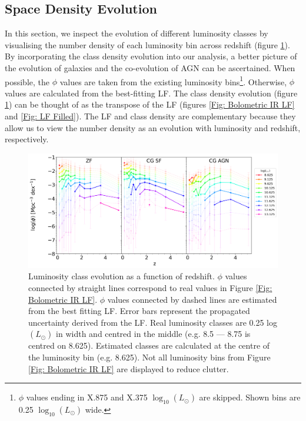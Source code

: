 \subsection{Space Density Evolution}
\label{Sec: Class Density}

In this section, we inspect the evolution of different luminosity classes by visualising the number density of each luminosity bin across redshift (figure \ref{Fig: Class Evo}). By incorporating the class density evolution into our analysis, a better picture of the evolution of galaxies and the co-evolution of AGN can be ascertained. When possible, the $\phi$ values are taken from the existing luminosity bins\footnote{$\phi$ values ending in X.875 and X.375 $\log_{10}(L_{\odot})$ are skipped. Shown bins are 0.25 $\log_{10}(L_{\odot})$ wide.}. Otherwise, $\phi$ values are calculated from the best-fitting LF. The class density evolution (figure \ref{Fig: Class Evo}) can be thought of as the transpose of the LF (figures \ref{Fig: Bolometric IR LF} and \ref{Fig: LF Filled}). The LF and class density are complementary because they allow us to view the number density as an evolution with luminosity and redshift, respectively. 

\begin{figure}[ht!]
    \centering
    \includegraphics[width=\textwidth]{Figures/Class_Evo.png}
    \caption{Luminosity class evolution as a function of redshift. $\phi$ values connected by straight lines correspond to real values in Figure \ref{Fig: Bolometric IR LF}. $\phi$ values connected by dashed lines are estimated from the best fitting LF. Error bars represent the propagated uncertainty derived from the LF. Real luminosity classes are 0.25 log$(L_{\odot})$ in width and centred in the middle (e.g. 8.5 --- 8.75 is centred on 8.625). Estimated classes are calculated at the centre of the luminosity bin (e.g. 8.625). Not all luminosity bins from Figure \ref{Fig: Bolometric IR LF} are displayed to reduce clutter.}
    \label{Fig: Class Evo}
\end{figure}

